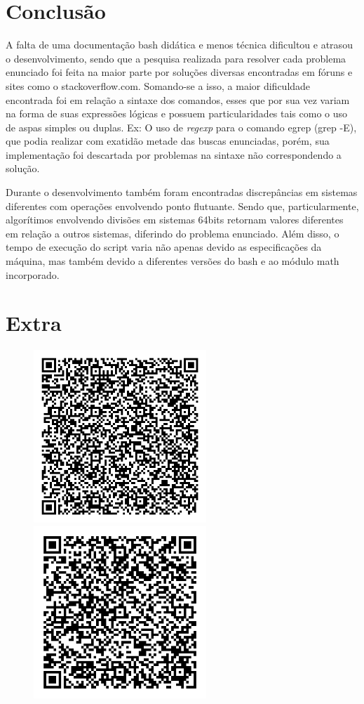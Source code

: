 \documentclass[12pt]{article}
\begin{document}
\pagebreak

\section{Conclusão}

A falta de uma documentação bash didática e menos técnica dificultou e atrasou o desenvolvimento, sendo que a pesquisa realizada para resolver cada problema enunciado  foi feita na maior parte por soluções diversas encontradas em fóruns e sites como o stackoverflow.com. Somando-se a isso, a maior dificuldade encontrada foi em relação a sintaxe dos comandos, esses que por sua vez variam na forma de suas expressões lógicas e possuem particularidades tais como o uso de aspas simples ou duplas. Ex: O uso de \textit{regexp} para o comando egrep (grep -E), que podia realizar com exatidão metade das buscas enunciadas, porém, sua implementação foi descartada por problemas na sintaxe não correspondendo a solução.

Durante o desenvolvimento também foram encontradas discrepâncias em sistemas diferentes com operações envolvendo ponto flutuante. Sendo que, particularmente, algorítimos envolvendo divisões em sistemas 64bits retornam valores diferentes em relação a outros sistemas, diferindo do problema enunciado. Além disso, o tempo de execução do script varia não apenas devido as especificações da máquina, mas também devido a diferentes versões do bash e ao módulo math incorporado.

\pagebreak

\section{Extra}

\begin{figure}[h]
    \centering
    \includegraphics[width=65mm]{imagens/pablo.jpg}
    \includegraphics[width=65mm]{imagens/marco.jpg}
\end{figure}
\end{document}
